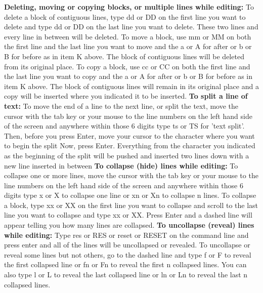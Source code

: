 \documentclass{report}
\begin{document}
\begin{itemize}
            \bigbreak \noindent 
            \textbf{Deleting, moving or copying blocks, or multiple lines while editing:} To delete a block of contiguous lines, type dd or DD on the first line you want to delete and type dd or DD on  the last line you want to delete. These two lines and every line in between will be deleted.
            \bigbreak \noindent 
            To move a block, use mm or MM on both the first line and the last line you want to move and the a or A for after or b or B for before as in item K above. The block of contiguous lines will be deleted from its original place.
            \bigbreak \noindent 
            To copy a block, use cc or CC on both the first line and the last line you want to copy and the a or A for after or b or B for before as in item K above. The block of contiguous lines will remain in its original place and a copy will be inserted where you indicated it to be inserted.
            \bigbreak \noindent 
            \textbf{To split a line of text:} To move the end of a line to the next line, or split the text, move the cursor with the tab key or your mouse to the line numbers on the left hand side of the screen and anywhere within those 6 digits type ts or TS for 'text split'. Then, before you press Enter, move your cursor to the character where you want to begin the split Now, press Enter. Everything from the character you indicated as the beginning of the split will be pushed and inserted two lines down with a new line inserted in between
            \bigbreak \noindent 
            \textbf{To collapse (hide) lines while editing:} To collapse one or more lines, move the cursor with the tab key or your mouse to the line numbers on the left hand side of the screen and anywhere within those 6 digits type x or X to collapse one line or xn or Xn to collapse n lines.
            \bigbreak \noindent 
            To collapse a block, type xx or XX on the first line you want to collapse and scroll to the last line you want to collapse and type xx or XX. Press Enter and a dashed line will appear telling you how many lines are collapsed.
            \bigbreak \noindent 
            \textbf{To uncollapse (reveal) lines while editing: } Type res or RES or reset or RESET on the command line and press enter and all of the lines will be uncollapsed or revealed.
            \bigbreak \noindent 
            To uncollapse or reveal some lines but not others, go to the dashed line and type f or F to reveal the first collapsed line or fn or Fn to reveal the first n collapsed lines. You can also type l or L to reveal the last collapsed line or ln or Ln to reveal the last n collapsed lines.

\end{itemize}
\end{document}
